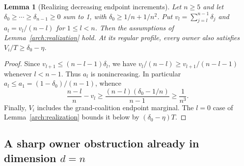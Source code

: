 \documentclass[11pt]{article}
\newtheorem{lemma}[theorem]{Lemma}
\theoremstyle{definition}\newtheorem{definition}[theorem]{Definition}
\theoremstyle{remark}\newtheorem{remark}[theorem]{Remark}
\begin{document}
\begin{lemma}[Realizing decreasing endpoint increments]
\label{arch:increments}
Let $n\ge5$ and let $\delta_0\ge\cdots\ge\delta_{n-1}\ge0$ sum to 1, with
$\delta_0\ge1/n+1/n^2$. Put
$v_l=\sum_{j=l}^{n-1}\delta_j$ and $a_l=v_l/(n-l)$ for $1\le l<n$.
Then the assumptions of Lemma~\ref{arch:realization} hold. At its regular
profile, every owner also satisfies $V_i/T\ge\delta_0-\eta$.
\end{lemma}
\begin{proof}
Since $v_{l+1}\le(n-l-1)\delta_l$, we have
$v_l/(n-l)\ge v_{l+1}/(n-l-1)$ whenever $l<n-1$.
Thus $a_l$ is nonincreasing. In particular
$a_l\le a_1=(1-\delta_0)/(n-1)$, whence
\[
 \frac{n-l}{n}-v_l
 \ge\frac{(n-l)(\delta_0-1/n)}{n-1}
 \ge\frac1{n^3}.
\]
Finally, $V_i$ includes the grand-coalition endpoint marginal. The $l=0$
case of Lemma~\ref{arch:realization} bounds it below by
$(\delta_0-\eta)T$.
\end{proof}

\subsection{A sharp owner obstruction already in dimension $d=n$}
\end{document}
